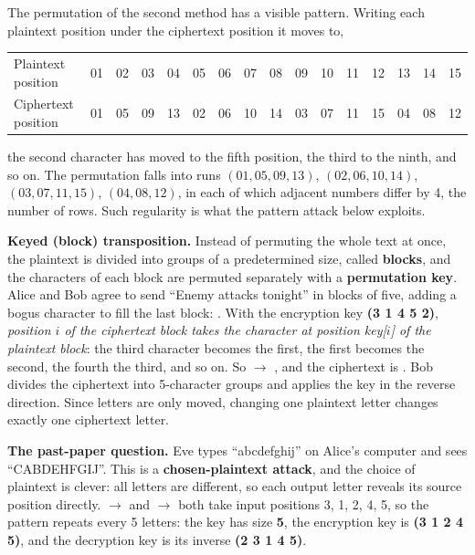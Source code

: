 The permutation of the second method has a visible pattern. Writing each plaintext position under the ciphertext position it moves to,
\begin{center}\small\setlength{\tabcolsep}{3.5pt}
\begin{tabular}{@{}l*{15}{c}@{}}
\toprule
Plaintext position & 01&02&03&04&05&06&07&08&09&10&11&12&13&14&15\\
Ciphertext position & 01&05&09&13&02&06&10&14&03&07&11&15&04&08&12\\
\bottomrule
\end{tabular}
\end{center}
the second character has moved to the fifth position, the third to the ninth, and so on. The permutation falls into runs $(01, 05, 09, 13)$, $(02, 06, 10, 14)$, $(03, 07, 11, 15)$, $(04, 08, 12)$, in each of which adjacent numbers differ by 4, the number of rows. Such regularity is what the pattern attack below exploits.

\textbf{Keyed (block) transposition.} Instead of permuting the whole text at once, the plaintext is divided into groups of a predetermined size, called \textbf{blocks}, and the characters of each block are permuted separately with a \textbf{permutation key}. Alice and Bob agree to send ``Enemy attacks tonight'' in blocks of five, adding a bogus character  to fill the last block: . With the encryption key \textbf{(3 1 4 5 2)}, \emph{position $i$ of the ciphertext block takes the character at position key[$i$] of the plaintext block}: the third character becomes the first, the first becomes the second, the fourth the third, and so on. So  $\to$ , and the ciphertext is \textbf{}. Bob divides the ciphertext into 5-character groups and applies the key in the reverse direction. Since letters are only moved, changing one plaintext letter changes exactly one ciphertext letter.

\textbf{The past-paper question.} Eve types ``abcdefghij'' on Alice's computer and sees ``CABDEHFGIJ''. This is a \textbf{chosen-plaintext attack}, and the choice of plaintext is clever: all letters are different, so each output letter reveals its source position directly.  $\to$  and  $\to$  both take input positions 3, 1, 2, 4, 5, so the pattern repeats every 5 letters: the key has size \textbf{5}, the encryption key is \textbf{(3 1 2 4 5)}, and the decryption key is its inverse \textbf{(2 3 1 4 5)}.

